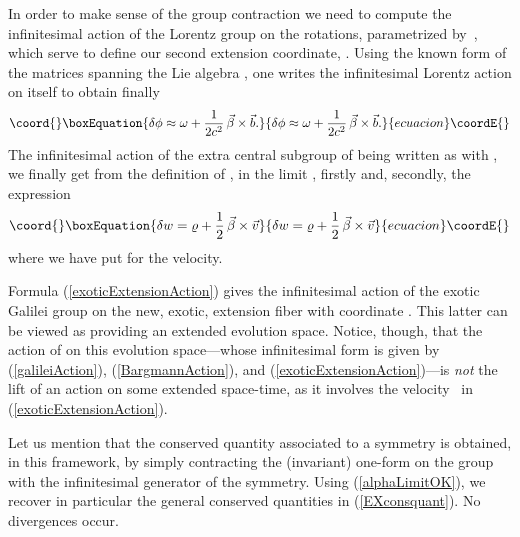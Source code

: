 \documentclass[a4paper,11pt]{article}
\providecommand{\bR}{{\bf R}}
\def\vb{{\vec b}}
\def\vbeta{{\vec\beta}}
\def\vp{{\vec p}}
\def\vv{{\vec v}}
\begin{document}
In order to make sense of the group contraction
\coordHE{}
we need to compute the infinitesimal action of the Lorentz group on the
rotations, parametrized by~\myHighlight{$\phi$}\coordHE{}, which serve to define our second extension
coordinate, \coordHE{}.
Using the known form of the matrices spanning
the Lie algebra \coordHE{}, one writes the infinitesimal
Lorentz action
on itself to obtain  finally
\begin{equation}\coord{}\boxEquation{
\delta\phi
\approx
\omega+\frac{1}{2c^2}\,\vbeta\times\vb.
\label{deltaphi}
}{
\delta\phi
\approx
\omega+\frac{1}{2c^2}\,\vbeta\times\vb.
}{ecuacion}\coordE{}\end{equation}
The infinitesimal action of the extra central subgroup \myHighlight{$(\bR,+)$}\coordHE{} of
\coordHE{}
being written as
\coordHE{}
with \myHighlight{$\varrho,\omega'\in\bR$}\coordHE{}, we finally get from the definition of
\coordHE{}, in the limit
\coordHE{}, firstly \coordHE{} and, secondly, the
expression
\begin{equation}\coord{}\boxEquation{
\delta{w}=\varrho+\frac{1}{2}\,\vbeta\times\vv
\label{exoticExtensionAction}
}{
\delta{w}=\varrho+\frac{1}{2}\,\vbeta\times\vv
}{ecuacion}\coordE{}\end{equation}
where we have put \myHighlight{$\vv=\vp/m$}\coordHE{} for the
velocity.

Formula (\ref{exoticExtensionAction}) gives the
infinitesimal action of the exotic Galilei
group \coordHE{} on the new, exotic,
extension fiber with coordinate \coordHE{}. This latter can be viewed as providing an
extended evolution space.
Notice, though, that the action of
\coordHE{} on this evolution space---whose
infinitesimal
form is given by (\ref{galileiAction}),
(\ref{BargmannAction}), and
(\ref{exoticExtensionAction})---is {\it not} the lift of an
action on some extended space-time, as it involves the velocity~\myHighlight{$\vv$}\coordHE{} in
(\ref{exoticExtensionAction}).


Let us mention that the conserved quantity associated to a symmetry
is obtained, in this framework, by simply contracting the (invariant)
one-form \myHighlight{$\widehat{\!\widehat{\alpha}}$}\coordHE{} on the group with the
infinitesimal generator of the
 symmetry. Using (\ref{alphaLimitOK}),
we recover in particular the general conserved
quantities in (\ref{EXconsquant}). No divergences occur.
\end{document}
